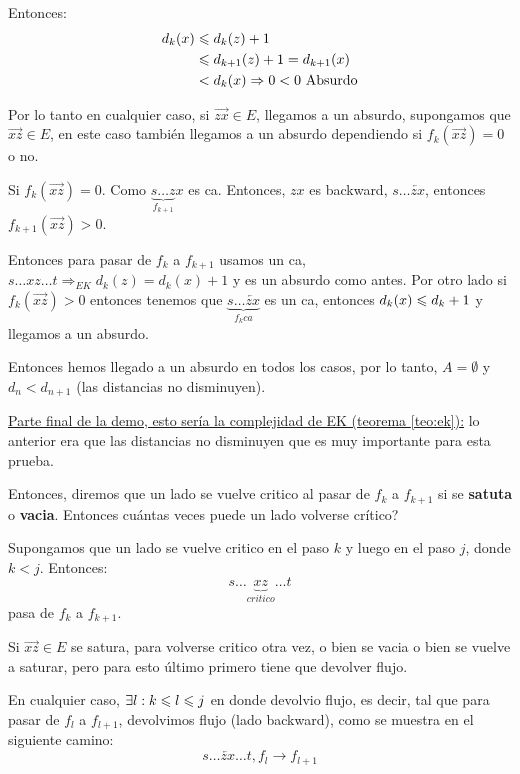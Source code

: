 \documentclass[12pt,a4paper]{article}
\begin{document}
Entonces: 
\begin{align*}
    d_{k}(x) &\leqslant d_{k}(z)+1\\
    & \leqslant d_{k+1}(z) +1 = d_{k+1}(x)\\
    & < d_{k}(x) \Rightarrow 0 < 0 \,\,\text{Absurdo}
\end{align*}

Por lo tanto en cualquier caso, si $\overrightarrow{zx} \in E$, llegamos a un absurdo, 
supongamos que $\overrightarrow{xz} \in E$, en este caso también llegamos a un absurdo 
dependiendo si $f_{k}(\overrightarrow{xz}) = 0$ o no.
\medskip

Si $f_{k}(\overrightarrow{xz}) = 0$. Como $\underbrace{s\ldots z}_{f_{k+1}}x$ es ca. 
Entonces, $zx$ es backward, $s\ldots \overleftarrow{zx}$, entonces $f_{k+1}(\overrightarrow{xz}) > 0$.
\medskip

Entonces para pasar de $f_{k}$ a $f_{k+1}$ usamos un ca, $s\ldots xz \ldots t\Rightarrow_{EK} d_{k}(z) = d_{k}(x)+1$ 
y es un absurdo como antes. Por otro lado si $f_{k}(\overrightarrow{xz}) > 0$ entonces 
tenemos que $\underbrace{s\ldots \overleftarrow{zx}}_{f_{k} ca}$ es un ca, entonces 
$d_{k}(x)\leqslant d_{k}+1$ y llegamos a un absurdo.
\medskip

Entonces hemos llegado a un absurdo en todos los casos, por lo tanto, $A = \emptyset$ 
y $d_{n} < d_{n+1}$ (las distancias no disminuyen).
\medskip

\underline{Parte final de la demo, esto sería la complejidad de EK (teorema \ref{teo:ek}):} 
lo anterior era que las distancias no disminuyen que es muy importante para esta prueba.
\medskip

Entonces, diremos que un lado se vuelve critico al pasar de $f_{k}$ a $f_{k+1}$ si 
se \textbf{satuta} o \textbf{vacia}. Entonces cuántas veces puede un lado volverse 
crítico?
\medskip

Supongamos que un lado se vuelve critico en el paso $k$ y luego en el paso $j$, 
donde $k < j$. Entonces:
$$s \ldots \underbrace{xz}_{critico}\ldots t$$
pasa de $f_{k}$ a $f_{k+1}$.
\medskip

Si $\overrightarrow{xz} \in E$ se satura, para volverse critico otra vez, o bien se 
vacia o bien se vuelve a saturar, pero para esto último primero tiene que devolver 
flujo.
\medskip

En cualquier caso, $\exists l: k \leqslant l \leqslant j$ en donde devolvio flujo, es decir, tal que 
para pasar de $f_{l}$ a $f_{l+1}$, devolvimos flujo (lado backward), como se muestra 
en el siguiente camino:
$$s \ldots \overleftarrow{zx} \ldots t, f_{l} \to f_{l+1}$$
\end{document}
